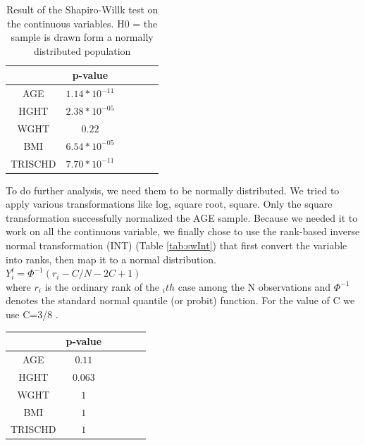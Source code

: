 \documentclass[a4paper, 11pt]{article}
\begin{document}
\begin{multicols}{2}
\begin{table}[H]
\begin{center}
	\setlength{\tabcolsep}{0.5pt}
	\begin{tabular}{ |c|c|c|c|c|c| } 
	\hline 
	& p-value   \\[0.2cm] 
	\hline
	 AGE &\small $1.14*10^{-11} $   \\ [0.1cm]
	\hline
	 HGHT &\small $2.38*10^{-05} $  \\[0.1cm]
	\hline
	 WGHT & \small $ 0.22 $  \\[0.1cm]
	\hline
	 BMI &   \small $6.54*10^{-05}  $ \\[0.1cm]
	\hline
	 TRISCHD &\small $7.70*10^{-11}$ \\[0.1cm]
	\hline
	 
\end{tabular}
\end{center}
\caption{Result of the Shapiro-Willk test on the continuous variables. H0 = the sample is drawn form a normally distributed population}
\label{tab:swNum}
\end{table}






To do further analysis, we need them to be normally distributed. 
We tried to apply various transformations like log, square root, square. 
Only the square transformation successfully normalized the AGE sample. 
Because we needed it to work on all the continuous variable, we finally chose to use the rank-based inverse normal transformation (INT) (Table \ref{tab:swInt})
that first convert the variable into ranks, then map it to a normal distribution. 
\\
$ Y^t_{i}=  \Phi^{-1}(r_i-C/N-2C+1) $ %
\\

where $r_i$ is the ordinary rank of the $_ith$ case among the N observations and $\Phi^{-1}$ denotes the standard normal quantile (or probit) function.
For the value of C we use C=3/8 \citep{beasley2009rank}. %
\begin{table}[H]
\begin{center}
	\setlength{\tabcolsep}{0.5pt}
	\begin{tabular}{ |c|c|c|c|c|c| } 
	\hline 
	& p-value   \\[0.2cm] 
	\hline
	 AGE &\small $0.11 $   \\ [0.1cm]
	\hline
	 HGHT & \small $0.063 $ \\[0.1cm]
	\hline
	 WGHT & \small $ 1 $   \\[0.1cm]
	\hline
	 BMI &  \small $1 $\\[0.1cm]
	\hline
	 TRISCHD &\small $1$  \\[0.1cm]
	\hline
	 

\end{tabular}
\end{center}
\end{table}
\end{multicols}
\end{document}
